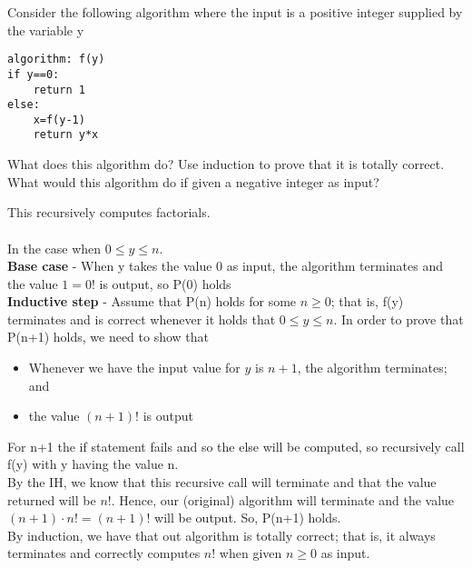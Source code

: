 \documentclass[addpoints]{exam}
\begin{document}
\begin{questions}
\question[8]Consider the following algorithm where the input is a positive integer supplied by the variable y
\begin{lstlisting}
algorithm: f(y)
if y==0:
	return 1
else:
	x=f(y-1)
	return y*x
\end{lstlisting}
What does this algorithm do? Use induction to prove that it is totally correct. What would this algorithm do if given a negative integer as input?
\begin{solution}[2in]
This recursively computes factorials.\\
\\
In the case when $0\leqslant y\leqslant n$.\\
\textbf{Base case} - When y takes the value 0 as input, the algorithm terminates and the value $1=0!$ is output, so P(0) holds\\
\textbf{Inductive step}  - Assume that P(n) holds for some $n\geqslant 0$; that is, f(y) terminates and is correct whenever it holds that $0\leqslant y\leqslant n$. In order to prove that P(n+1) holds, we need to show that
\begin{itemize}
	\item Whenever we have the input value for $y$ is $n+1$, the algorithm terminates; and
	\item the value $(n+1)!$ is output
\end{itemize}
For n+1 the if statement fails and so the else will be computed, so recursively call f(y) with y having the value n.\\
By the IH, we know that this recursive call will terminate and that the value returned will be $n!$. Hence, our (original) algorithm will terminate and the value $(n+1)\cdot n!=(n+1)!$ will be output. So, P(n+1) holds.\\
By induction, we have that out algorithm is totally correct; that is, it always terminates and correctly computes $n!$ when given $n\geqslant 0$ as input.
\end{solution}


\end{questions}
\end{document}
